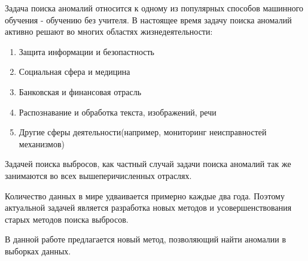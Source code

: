 \Introduction

Задача поиска аномалий относится к одному из популярных способов машинного обучения - обучению без учителя. В настоящее время задачу поиска аномалий активно решают во многих областях жизнедеятельности:
\begin{enumerate} 
	\item Защита информации и безопастность
	\item Социальная сфера и медицина
	\item Банковская и финансовая отрасль
	\item Распознавание и обработка текста, изображений, речи
	\item Другие сферы деятельности(например, мониторинг неисправностей механизмов)
\end{enumerate}
Задачей поиска выбросов, как частный случай задачи поиска аномалий так же занимаются во всех вышеперичисленных отраслях. 

Количество данных в мире удваивается примерно каждые два года. Поэтому актуальной задачей является разработка новых методов и усовершенствования старых методов поиска выбросов.

В данной работе предлагается новый метод, позволяющий найти аномалии в выборках данных.




